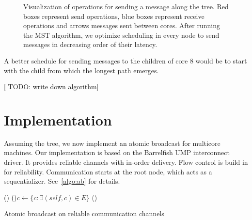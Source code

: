 \documentclass{article}
\newcommand{\stefan}[1]{
  {\color{skRed}[{\color{red}{SK}} #1]}}
\begin{document}
\begin{figure}[htb]
  \centering
  \begin{tikzpicture}[scale=.35,transform shape]
    
  \end{tikzpicture}
  \caption{Visualization of operations for sending a message along the
    tree. Red boxes represent send operations, blue boxes represent
    receive operations and arrows messages sent between cores. After
    running the MST algorithm, we optimize scheduling in every node to
    send messages in decreasing order of their latency.}
  \label{fig:mst_gruyere_operations_sorted}
\end{figure}

A better schedule for sending messages to the children of core 8 would
be to start with the child from which the longest path emerges.

\stefan{TODO: write down algorithm}

\section{Implementation}

Assuming the tree, we now implement an atomic broadcast for multicore
machines. Our implementation is based on the Barrelfish UMP
interconnect driver. It provides reliable channels with in-order
delivery. Flow control is build in for reliability. Communication
starts at the root node, which acts as a
sequentializer. See~\ref{algo:ab} for details.

\begin{algorithm}[htb]
%
%
%
%
%
%
%
  \BlankLine
  \Fn(){}{
    \For(){$c \leftarrow \{ c: \exists (self, c) \in E \} $}{
    }
    \waitchild{}\;
    \;
  }
  \BlankLine
  \Fn(){}{
  }
  \caption{Atomic broadcast on reliable communication channels}
  \label{algo:ab}

\end{algorithm}
\end{document}
